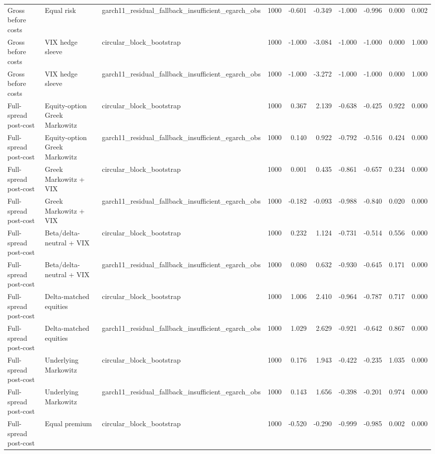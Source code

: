 \begin{tabular}{lllrrrrrrr}
Gross before costs & Equal risk & garch11\_residual\_fallback\_insufficient\_egarch\_obs & 1000 & -0.601 & -0.349 & -1.000 & -0.996 & 0.000 & 0.002 \\
Gross before costs & VIX hedge sleeve & circular\_block\_bootstrap & 1000 & -1.000 & -3.084 & -1.000 & -1.000 & 0.000 & 1.000 \\
Gross before costs & VIX hedge sleeve & garch11\_residual\_fallback\_insufficient\_egarch\_obs & 1000 & -1.000 & -3.272 & -1.000 & -1.000 & 0.000 & 1.000 \\
Full-spread post-cost & Equity-option Greek Markowitz & circular\_block\_bootstrap & 1000 & 0.367 & 2.139 & -0.638 & -0.425 & 0.922 & 0.000 \\
Full-spread post-cost & Equity-option Greek Markowitz & garch11\_residual\_fallback\_insufficient\_egarch\_obs & 1000 & 0.140 & 0.922 & -0.792 & -0.516 & 0.424 & 0.000 \\
Full-spread post-cost & Greek Markowitz + VIX & circular\_block\_bootstrap & 1000 & 0.001 & 0.435 & -0.861 & -0.657 & 0.234 & 0.000 \\
Full-spread post-cost & Greek Markowitz + VIX & garch11\_residual\_fallback\_insufficient\_egarch\_obs & 1000 & -0.182 & -0.093 & -0.988 & -0.840 & 0.020 & 0.000 \\
Full-spread post-cost & Beta/delta-neutral + VIX & circular\_block\_bootstrap & 1000 & 0.232 & 1.124 & -0.731 & -0.514 & 0.556 & 0.000 \\
Full-spread post-cost & Beta/delta-neutral + VIX & garch11\_residual\_fallback\_insufficient\_egarch\_obs & 1000 & 0.080 & 0.632 & -0.930 & -0.645 & 0.171 & 0.000 \\
Full-spread post-cost & Delta-matched equities & circular\_block\_bootstrap & 1000 & 1.006 & 2.410 & -0.964 & -0.787 & 0.717 & 0.000 \\
Full-spread post-cost & Delta-matched equities & garch11\_residual\_fallback\_insufficient\_egarch\_obs & 1000 & 1.029 & 2.629 & -0.921 & -0.642 & 0.867 & 0.000 \\
Full-spread post-cost & Underlying Markowitz & circular\_block\_bootstrap & 1000 & 0.176 & 1.943 & -0.422 & -0.235 & 1.035 & 0.000 \\
Full-spread post-cost & Underlying Markowitz & garch11\_residual\_fallback\_insufficient\_egarch\_obs & 1000 & 0.143 & 1.656 & -0.398 & -0.201 & 0.974 & 0.000 \\
Full-spread post-cost & Equal premium & circular\_block\_bootstrap & 1000 & -0.520 & -0.290 & -0.999 & -0.985 & 0.002 & 0.000 \\

\end{tabular}
